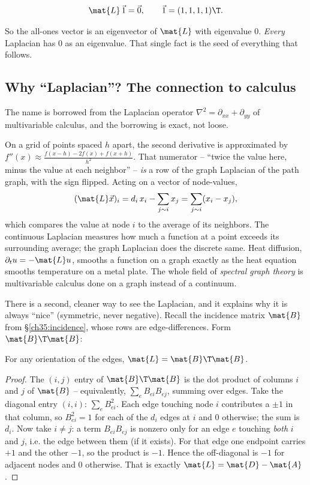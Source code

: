 \[
\mat{L}\,\vec{1} = \vec{0}, \qquad \vec{1} = (1,1,1,1)\T.
\]

So the all-ones vector is an eigenvector of $\mat{L}$ with eigenvalue $0$. \emph{Every}
Laplacian has $0$ as an eigenvalue. That single fact is the seed of everything that
follows.

\subsection{Why ``Laplacian''? The connection to calculus}

The name is borrowed from the Laplacian operator $\nabla^2 = \partial_{xx} + \partial_{yy}$
of multivariable calculus, and the borrowing is exact, not loose.

\begin{connectionbox}
On a grid of points spaced $h$ apart, the second derivative is approximated by
$f''(x) \approx \frac{f(x-h) - 2f(x) + f(x+h)}{h^2}$. That numerator -- ``twice the value
here, minus the value at each neighbor'' -- \emph{is} a row of the graph Laplacian of the
path graph, with the sign flipped. Acting on a vector of node-values,
\[
(\mat{L}\vec{x})_i = d_i\, x_i - \sum_{j \sim i} x_j = \sum_{j \sim i} (x_i - x_j),
\]
which compares the value at node $i$ to the average of its neighbors. The continuous
Laplacian measures how much a function at a point exceeds its surrounding average; the
graph Laplacian does the discrete same. Heat diffusion, $\partial_t u = -\mat{L}u$,
smooths a function on a graph exactly as the heat equation smooths temperature on a metal
plate. The whole field of \emph{spectral graph theory} is multivariable calculus done on
a graph instead of a continuum.
\end{connectionbox}

There is a second, cleaner way to see the Laplacian, and it explains why it is always
``nice'' (symmetric, never negative). Recall the incidence matrix $\mat{B}$ from
\S\ref{ch35:incidence}, whose rows are edge-differences. Form $\mat{B}\T \mat{B}$:

\begin{theorem}
\label{ch35:thm-btb}
For any orientation of the edges, $\mat{L} = \mat{B}\T \mat{B}$.
\end{theorem}

\begin{proof}
The $(i,j)$ entry of $\mat{B}\T \mat{B}$ is the dot product of columns $i$ and $j$ of
$\mat{B}$ -- equivalently, $\sum_e B_{ei}B_{ej}$, summing over edges. Take the diagonal
entry $(i,i)$: $\sum_e B_{ei}^2$. Each edge touching node $i$ contributes a $\pm 1$ in that
column, so $B_{ei}^2 = 1$ for each of the $d_i$ edges at $i$ and $0$ otherwise; the sum is
$d_i$. Now take $i \ne j$: a term $B_{ei}B_{ej}$ is nonzero only for an edge $e$ touching
\emph{both} $i$ and $j$, i.e. the edge between them (if it exists). For that edge one
endpoint carries $+1$ and the other $-1$, so the product is $-1$. Hence the off-diagonal is
$-1$ for adjacent nodes and $0$ otherwise. That is exactly $\mat{L} = \mat{D}-\mat{A}$.
\end{proof}

